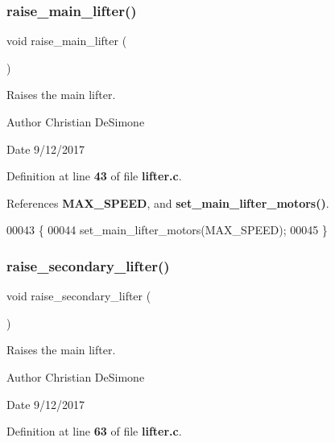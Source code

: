 \subsubsection{raise\+\_\+main\+\_\+lifter()}
{\footnotesize\ttfamily void raise\+\_\+main\+\_\+lifter (\begin{DoxyParamCaption}{ }\end{DoxyParamCaption})}



Raises the main lifter. 

\begin{DoxyAuthor}{Author}
Christian De\+Simone 
\end{DoxyAuthor}
\begin{DoxyDate}{Date}
9/12/2017 
\end{DoxyDate}


Definition at line \textbf{ 43} of file \textbf{ lifter.\+c}.



References \textbf{ M\+A\+X\+\_\+\+S\+P\+E\+ED}, and \textbf{ set\+\_\+main\+\_\+lifter\+\_\+motors()}.


\begin{DoxyCode}
00043                         \{
00044   set_main_lifter_motors(MAX_SPEED);
00045 \}
\end{DoxyCode}
\mbox{\label{lifter_8h_a786f679ea48bb8c80e00fbac9a69911b}} 
\subsubsection{raise\+\_\+secondary\+\_\+lifter()}
{\footnotesize\ttfamily void raise\+\_\+secondary\+\_\+lifter (\begin{DoxyParamCaption}{ }\end{DoxyParamCaption})}



Raises the main lifter. 

\begin{DoxyAuthor}{Author}
Christian De\+Simone 
\end{DoxyAuthor}
\begin{DoxyDate}{Date}
9/12/2017 
\end{DoxyDate}


Definition at line \textbf{ 63} of file \textbf{ lifter.\+c}.



